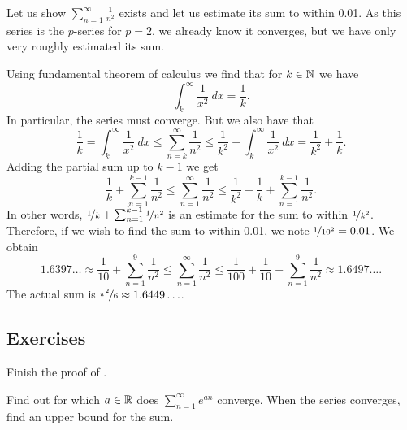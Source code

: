 \begin{example}
Let us show $\sum_{n=1}^\infty \frac{1}{n^2}$ exists and let us
estimate its sum to within 0.01.  As this series is the $p$-series for
$p=2$, we already know it converges, but we have only very roughly
estimated its sum.

Using fundamental theorem of calculus we find that for $k \in {\mathbb{N}}$
we have
\begin{equation*}
\int_{k}^\infty \frac{1}{x^2}~dx = \frac{1}{k} .
\end{equation*}
In particular, the series must converge.  But we also have that
\begin{equation*}
\frac{1}{k} = \int_k^\infty \frac{1}{x^2}~dx
\leq
\sum_{n=k}^\infty \frac{1}{n^2}
\leq
\frac{1}{k^2}
+
\int_k^\infty \frac{1}{x^2}~dx
=
\frac{1}{k^2}
+
\frac{1}{k} .
\end{equation*}
Adding the partial sum up to $k-1$ we get
\begin{equation*}
\frac{1}{k} + \sum_{n=1}^{k-1} \frac{1}{n^2}
\leq
\sum_{n=1}^\infty \frac{1}{n^2}
\leq
\frac{1}{k^2}
+
\frac{1}{k} + \sum_{n=1}^{k-1} \frac{1}{n^2} .
\end{equation*}
In other words,
$\nicefrac{1}{k} + \sum_{n=1}^{k-1} \nicefrac{1}{n^2}$ is an estimate for
the sum to within $\nicefrac{1}{k^2}$.  Therefore, if we wish to
find the sum to within 0.01, we note $\nicefrac{1}{{10}^2} = 0.01$.  We
obtain
\begin{equation*}
1.6397\ldots
\approx
\frac{1}{10} + \sum_{n=1}^{9} \frac{1}{n^2}
\leq
\sum_{n=1}^\infty \frac{1}{n^2}
\leq
\frac{1}{100}
+
\frac{1}{10} + \sum_{n=1}^{9} \frac{1}{n^2}
\approx
1.6497\ldots .
\end{equation*}
The actual sum is $\nicefrac{\pi^2}{6} \approx 1.6449\ldots$. 
\end{example}

\subsection{Exercises}

\begin{exercise}
Finish the proof of .
\end{exercise}

\begin{exercise}
Find out for which $a \in {\mathbb{R}}$ does $\sum\limits_{n=1}^\infty e^{an}$ converge.
When the series converges, find an upper bound for the sum.
\end{exercise}

